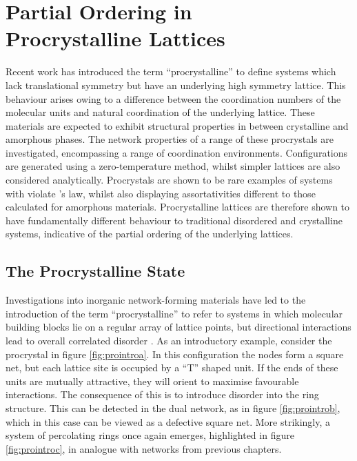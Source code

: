 \chapter[Partial Ordering in Procrystalline Lattices]{Partial Ordering in \\ Procrystalline Lattices} 
\label{ch:procrystals}

\begin{chapterabstract}
Recent work has introduced the term ``procrystalline'' to define systems which lack translational symmetry but have an underlying high symmetry lattice.
This behaviour arises owing to a difference between the coordination numbers of the molecular units and natural coordination of the underlying lattice.
These materials are expected to exhibit structural properties in between crystalline and amorphous phases.
The network properties of a range of these procrystals are investigated, encompassing a range of coordination environments.
Configurations are generated using a zero\--temperature \mc{} method, whilst simpler lattices are also considered analytically.
Procrystals are shown to be rare examples of systems with violate \lm{}'s law, whilst also displaying assortativities different to those calculated for amorphous materials.
Procrystalline lattices are therefore shown to have fundamentally different behaviour to traditional disordered and crystalline systems, indicative of the partial ordering of the underlying lattices.
\end{chapterabstract}

\section{The Procrystalline State}

Investigations into inorganic network\--forming materials have led to the introduction of the term ``procrystalline'' to refer to systems in which molecular building blocks lie on a regular array of lattice points, but directional interactions lead to overall correlated disorder \cite{Overy2016}.
As an introductory example, consider the procrystal in figure \ref{fig:prointroa}.
In this configuration the nodes form a square net, but each lattice site is occupied by a ``T'' shaped unit.
If the ends of these units are mutually attractive, they will orient to maximise favourable interactions.
The consequence of this is to introduce disorder into the ring structure.
This can be detected in the dual network, as in figure \ref{fig:prointrob}, which in this case can be viewed as a defective square net.
More strikingly, a system of percolating rings once again emerges, highlighted in figure \ref{fig:prointroc}, in analogue with networks from previous chapters. 

